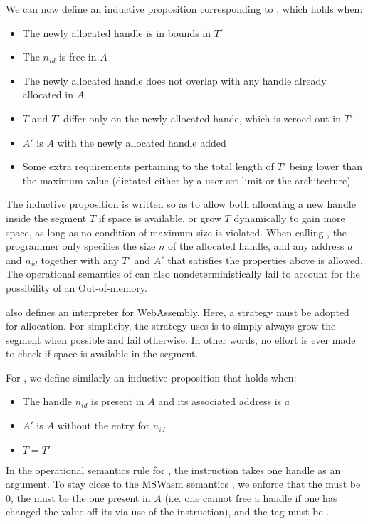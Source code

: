 \documentclass[a4paper]{article}
\begin{document}
We can now define an inductive proposition corresponding to , which holds when:
\begin{itemize}
\item The newly allocated handle is in bounds in \( T' \)
\item The \xxWid \( n_{id} \) is free in \( A \)
\item The newly allocated handle does not overlap with any handle already allocated in \( A \)
\item \( T \) and \( T' \) differ only on the newly allocated hande, which is zeroed out in \( T' \)
\item \( A' \) is \( A \) with the newly allocated handle added
\item Some extra requirements pertaining to the total length of \( T' \) being lower than the maximum value (dictated either by a user-set limit or the architecture)
\end{itemize}
The inductive proposition is written so as to allow both allocating a new handle inside the segment \( T \) if space is available, or grow \( T \) dynamically to gain more space, as long as no condition of maximum size is violated. When calling \xxWsegalloc, the programmer only specifies the size \( n \) of the allocated handle, and any address \( a \) and \xxWid \( n_{id} \) together with any \( T' \) and \( A' \) that satisfies the properties above is allowed. The operational semantics of \xxWsegalloc can also nondeterministically fail to account for the possibility of an Out-of-memory.

\iriswasm also defines an interpreter for WebAssembly. Here, a strategy must be adopted for allocation. For simplicity, the strategy \irismswasm uses is to simply always grow the segment when possible and fail otherwise. In other words, no effort is ever made to check if space is available in the segment.

For , we define similarly an inductive proposition that holds when:
\begin{itemize}
\item The handle \xxWid \( n_{id} \) is present in \( A \) and its associated address is \( a \)
\item \( A' \) is \( A \) without the entry for \( n_{id} \)
\item \( T = T' \)
\end{itemize}
In the operational semantics rule for \xxWsegfree, the instruction takes one handle as an argument. To stay close to the MSWasm semantics \cite{mswasm}, we enforce that the \xxWoffset must be 0, the \xxWbase must be the one present in \( A \) (i.e. one cannot free a handle if one has changed the value off its \xxWbase via use of the \xxWslice instruction), and the \xxWvalid tag must be \xxCtrue. 
\end{document}
